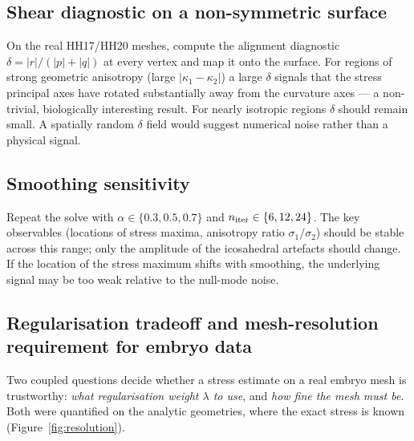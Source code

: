 \documentclass[11pt]{article}
\begin{document}
\subsection{Shear diagnostic on a non-symmetric surface}

On the real HH17/HH20 meshes, compute the alignment diagnostic
$\delta=|r|/(|p|+|q|)$ at every vertex and map it onto the surface.  For
regions of strong geometric anisotropy (large $|\kappa_1-\kappa_2|$) a
large $\delta$ signals that the stress principal axes have rotated
substantially away from the curvature axes — a non-trivial, biologically
interesting result.  For nearly isotropic regions $\delta$ should remain
small.  A spatially random $\delta$ field would suggest numerical noise
rather than a physical signal.

\subsection{Smoothing sensitivity}

Repeat the solve with $\alpha\in\{0.3,0.5,0.7\}$ and
$n_{\rm iter}\in\{6,12,24\}$.  The key observables (locations of stress
maxima, anisotropy ratio $\sigma_1/\sigma_2$) should be stable across this
range; only the amplitude of the icosahedral artefacts should change.
If the location of the stress maximum shifts with smoothing, the underlying
signal may be too weak relative to the null-mode noise.

\subsection{Regularisation tradeoff and mesh-resolution requirement for embryo data}
\label{sec:resolution-requirement}

Two coupled questions decide whether a stress estimate on a real embryo
mesh is trustworthy: \emph{what regularisation weight $\lambda$ to use},
and \emph{how fine the mesh must be}.  Both were quantified on the analytic
geometries, where the exact stress is known (Figure~\ref{fig:resolution}).
\end{document}
